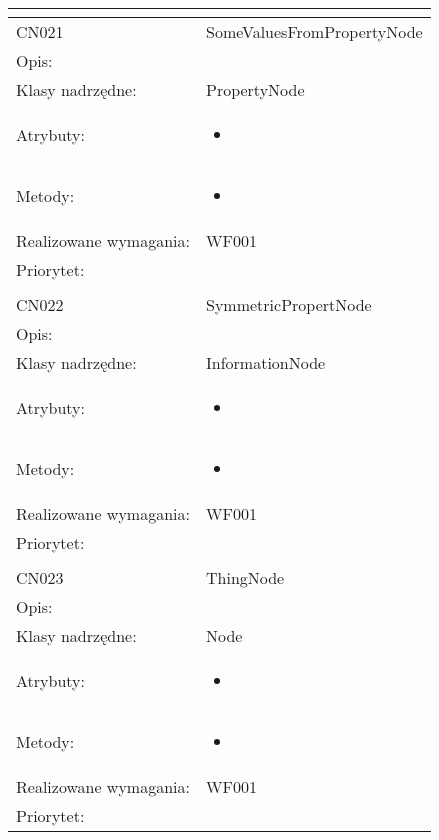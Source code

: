 \documentclass[a4paper,10pt]{article}
\begin{document}
\begin{center}
\begin{longtable}{|m{3cm}|m{9cm}|}
\multicolumn{2}{c}{} \\
 \hline

CN021 & SomeValuesFromPropertyNode \\ \hline
Opis: &     \\ \hline
Klasy nadrzędne: & PropertyNode     \\ \hline
Atrybuty: & \begin{itemize}
 \item 
\end{itemize}
 \\ \hline
Metody: & \begin{itemize}
 \item 
\end{itemize}
  \\ \hline
Realizowane wymagania: & WF001 \\ \hline
Priorytet: &  \\ \hline

\multicolumn{2}{c}{} \\
 \hline

CN022 & SymmetricPropertNode \\ \hline
Opis: &     \\ \hline
Klasy nadrzędne: & InformationNode     \\ \hline
Atrybuty: & \begin{itemize}
 \item 
\end{itemize}
 \\ \hline
Metody: & \begin{itemize}
 \item 
\end{itemize}
  \\ \hline
Realizowane wymagania: & WF001 \\ \hline
Priorytet: &  \\ \hline

\multicolumn{2}{c}{} \\
 \hline

CN023 & ThingNode \\ \hline
Opis: &     \\ \hline
Klasy nadrzędne: & Node     \\ \hline
Atrybuty: & \begin{itemize}
 \item 
\end{itemize}
 \\ \hline
Metody: & \begin{itemize}
 \item 
\end{itemize}
  \\ \hline
Realizowane wymagania: & WF001 \\ \hline
Priorytet: &  \\ \hline


\end{longtable}
\end{center}
\end{document}
